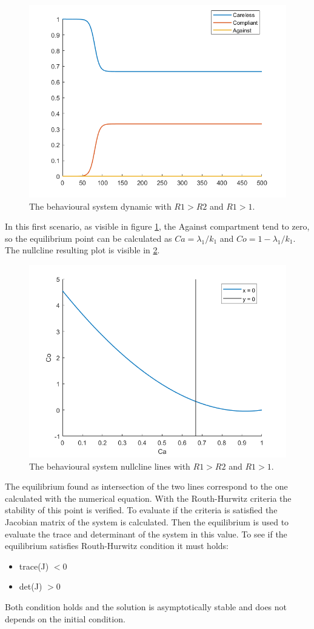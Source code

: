 \begin{figure}[h]
	\centering
	\includegraphics[width=0.7\linewidth]{figure/behavioural_equilibrium/r1greater1_dyn}
	\caption[Behavioural dynamic first case]{The behavioural system dynamic with $R1 > R2$ and $R1 > 1$.}
	\label{fig:r1greater1dyn}
\end{figure}
In this first scenario, as visible in figure \ref{fig:r1greater1dyn}, the Against compartment tend to zero, so the equilibrium point can be calculated as $Ca = \lambda_1/k_1$ and $Co = 1 - \lambda_1/k_1 $. 
The nullcline resulting plot is visible in \ref{fig:r1greater1nullcline}. 
\begin{figure}[h]
	\centering
	\includegraphics[width=0.7\linewidth]{figure/behavioural_equilibrium/r1greater1_nullcline}
	\caption[Behavioural nullcline first case]{The behavioural system nullcline lines with $R1 > R2$ and $R1 > 1$.}
	\label{fig:r1greater1nullcline}
\end{figure}

The equilibrium found as intersection of the two lines correspond to the one calculated with the numerical equation. With the Routh-Hurwitz criteria the stability of this point is verified. To evaluate if the criteria is satisfied the Jacobian matrix of the system is calculated. Then the equilibrium is used to evaluate the trace and determinant of the system in this value. To see if the equilibrium satisfies Routh-Hurwitz condition it must holds:
\begin{itemize}
	\item trace(J) $< 0$
	\item det(J) $> 0$
\end{itemize}
Both condition holds and the solution is asymptotically stable and does not depends on the initial condition.

